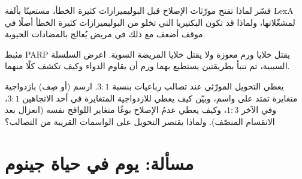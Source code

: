 \begin{exercise}[$\star\star\star$]\label{exo:b3:dna-repair:10}
فسّر لماذا تفتح  مورّثات الإصلاح قبل البوليميرازات
كثيرة الخطأ، مستعينًا بألفة LexA لمشغّلاتها، ولماذا قد تكون
البكتيريا التي تخلو من البوليميرازات كثيرة الخطأ أصلًا في
موقف أضعف مع ذلك في مريض يُعالج بالمضادات الحيوية.
\end{exercise}

\begin{exercise}[$\star\star\star$]\label{exo:b3:dna-repair:11}
مثبط PARP يقتل خلايا ورم معوزة \emph{} ولا يقتل خلايا المريضة
السوية. اعرض السلسلة السببية، ثم تنبأ بطريقتين يستطيع بهما ورم أن
يقاوم الدواء وكيف تكشف كلًا منهما.
\end{exercise}

\begin{exercise}[$\star\star\star$]\label{exo:b3:dna-repair:12}
يعطي التحويل المورّثي عند تصالب رباعيات بنسبة $3{:}1$. ارسم (أو صِف)
 بازدواجية متغايرة تمتد على واسم، وبيّن كيف يعطي  للازدواجية المتغايرة في أحد الاتجاهين $3{:}1$، وفي
الآخر $1{:}3$، وكيف يعطي عدمُ الإصلاح بوغًا متغاير اللواقح نفسه
(انعزال بعد الانقسام المنصّف). ولماذا يقتصر التحويل على الواسمات
القريبة من التصالب؟
\end{exercise}

\section{مسألة: يوم في حياة جينوم}

